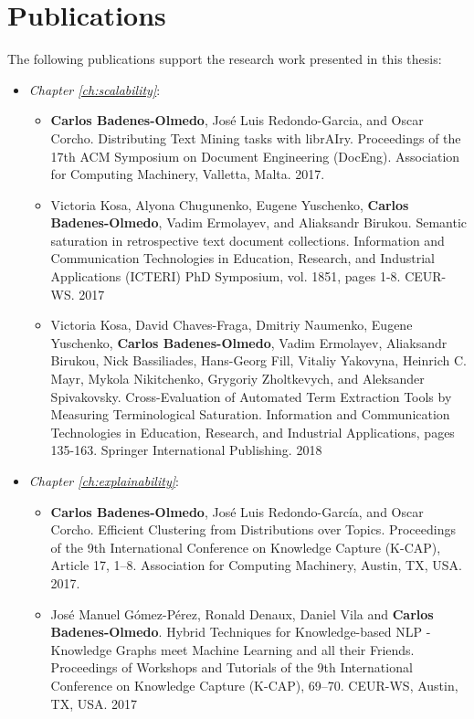 \section{Publications}

The following publications support the research work presented in this thesis:


\begin{itemize}
\item \textit{Chapter \ref{ch:scalability}}:
\begin{itemize}
\item \textbf{Carlos Badenes-Olmedo}, José Luis Redondo-Garcia, and Oscar Corcho. Distributing Text Mining tasks with librAIry. Proceedings of the 17th ACM Symposium on Document Engineering (DocEng). Association for Computing Machinery, Valletta, Malta. 2017.
\item Victoria Kosa, Alyona Chugunenko, Eugene Yuschenko, \textbf{Carlos Badenes-Olmedo}, Vadim Ermolayev, and Aliaksandr Birukou. Semantic saturation in retrospective text document collections. Information and Communication Technologies in Education, Research, and Industrial Applications (ICTERI) PhD Symposium, vol. 1851, pages 1-8. CEUR-WS. 2017
\item Victoria Kosa, David Chaves-Fraga, Dmitriy Naumenko, Eugene Yuschenko, \textbf{Carlos Badenes-Olmedo}, Vadim Ermolayev, Aliaksandr Birukou, Nick Bassiliades, Hans-Georg Fill, Vitaliy Yakovyna, Heinrich C. Mayr, Mykola Nikitchenko, Grygoriy Zholtkevych, and Aleksander Spivakovsky. Cross-Evaluation of Automated Term Extraction Tools by Measuring Terminological Saturation. Information and Communication Technologies in Education, Research, and Industrial Applications, pages 135-163. Springer International Publishing. 2018
\end{itemize}
\item \textit{Chapter \ref{ch:explainability}}:
\begin{itemize}
\item \textbf{Carlos Badenes-Olmedo}, José Luis Redondo-García, and Oscar Corcho. Efficient Clustering from Distributions over Topics. Proceedings of the 9th International Conference on Knowledge Capture (K-CAP), Article 17, 1–8. Association for Computing Machinery, Austin, TX, USA. 2017.
\item José Manuel Gómez-Pérez, Ronald Denaux, Daniel Vila and \textbf{Carlos Badenes-Olmedo}. Hybrid Techniques for Knowledge-based NLP - Knowledge Graphs meet Machine Learning and all their Friends. Proceedings of Workshops and Tutorials of the 9th International Conference on Knowledge Capture (K-CAP), 69–70. CEUR-WS, Austin, TX, USA. 2017

\end{itemize}
\end{itemize}
